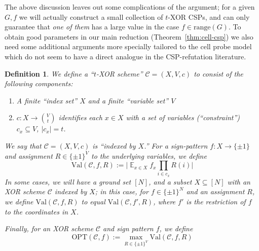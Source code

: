 \documentclass[11pt]{article}
\newtheorem{definition}{Definition}
\newcommand{\rng}{\mathrm{range}}
\newcommand{\E}{\mathop{\mathbb{E}}}
\newcommand{\Val}{\mathrm{Val}}
\newcommand{\Opt}{\mathrm{OPT}}
\newcommand{\N}{[N]}
\begin{document}
The above discussion leaves out some complications of the argument; for a given $G,f$ we will actually construct a small collection of $t$-XOR CSPs, and can only guarantee that \emph{one of them} has a large value in the case $f \in \rng(G)$. To obtain good parameters in our main reduction (Theorem~\ref{thm:cell-csp}) we also need some additional arguments more specially tailored to the cell probe model which do not seem to have a direct analogue in the CSP-refutation literature. 

\begin{definition}
We define a ``$t$-XOR scheme'' $\mathcal{C} = (X,V,c)$ to consist of the following components:
\begin{enumerate}
    \item A finite ``index set'' $X$ and a finite ``variable set'' $V$
    \item $c: X \to \binom{V}{t}$ identifies each $x \in X
    $ with a set of variables (``constraint'') $c_x \subseteq V$, $|c_x|=t$.
\end{enumerate}
We say that $\mathcal{C} = (X,V,c)$ is ``indexed by $X$.''
For a sign-pattern $f: X \to \{\pm 1\}$
and assignment $R \in \{\pm 1\}^V$ to the underlying variables,
we define
\[
\mathrm{Val}(\mathcal{C}, f,R):= \bigl|\E_{x \in X} f_x  \prod_{i \in c_x}R(i)\bigr|
\]
In some cases, we will have a ground set $\N$, and a subset $X\subseteq \N$ with an XOR scheme $\mathcal{C}$ indexed by $X$; in this case, for $f\in \{\pm 1\}^N$ and an assignment $R$, we define $\mathrm{Val}(\mathcal{C},f,R)$ to equal $\mathrm{Val}(\mathcal{C},f',R)$, where $f'$ is the restriction of $f$ to the coordinates in $X$.

Finally, for an XOR scheme $\mathcal{C}$ and sign pattern $f$, we define
\[
\Opt(\mathcal{C},f) := \max\limits_{R \in \{\pm 1\}^V} \Val(\mathcal{C},f,R)
\]

\end{definition}
\end{document}
